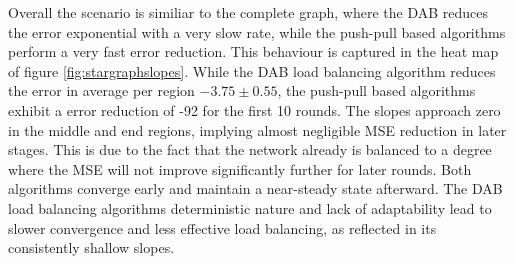 Overall the scenario is similiar to the complete graph, where the DAB reduces the error exponential with a very slow rate, while the push-pull based algorithms perform a very fast error reduction. This behaviour is captured in the heat map of figure \ref{fig:stargraphslopes}. While the DAB load balancing algorithm reduces the error in average per region $-3.75 \pm 0.55$, the push-pull based algorithms exhibit a error reduction of -92 for the first 10 rounds. The slopes approach zero in the middle and end regions, implying almost negligible MSE reduction in later stages. This is due to the fact that the network already is balanced to a degree where the MSE will not improve significantly further for later rounds. Both algorithms converge early and maintain a near-steady state afterward. The DAB load balancing algorithms deterministic nature and lack of adaptability lead to slower convergence and less effective load balancing, as reflected in its consistently shallow slopes.




